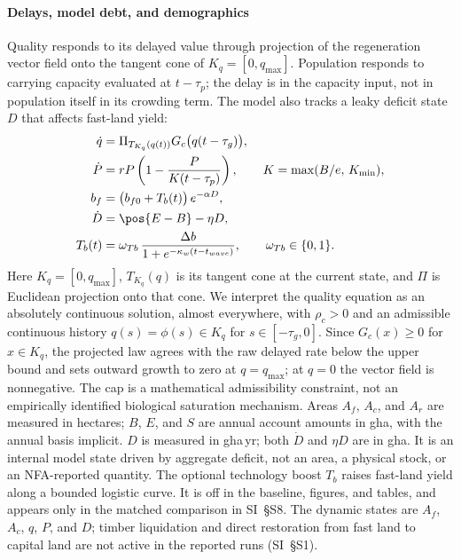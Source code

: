 \paragraph{Delays, model debt, and demographics} Quality responds to its delayed value through projection of the regeneration vector field onto the tangent cone of $K_q=[0,q_{\max}]$. Population responds to carrying capacity evaluated at $t-\tau_p$; the delay is in the capacity input, not in population itself in its crowding term. The model also tracks a leaky deficit state $D$ that affects fast-land yield:
\begin{align}
\dot q&=\Pi_{T_{K_q}(q(t))}G_c\big(q(t-\tau_g)\big),\label{eq:q}\\
\dot P&=rP\left(1-\frac{P}{K(t-\tau_p)}\right),\qquad K=\max(B/e,\,K_{\min}),\label{eq:P}\\
b_f&=\big(b_{f0}+T_b(t)\big)\,e^{-\alpha D},\label{eq:bf}\\
\dot D&=\pos{E-B}-\eta D,\label{eq:D}\\
T_b(t)&=\omega_{Tb}\,\frac{\Delta b}{1+e^{-\kappa_w(t-t_{wave})}},\qquad \omega_{Tb}\in\{0,1\}.\label{eq:Tb}
\end{align}
Here $K_q=[0,q_{\max}]$, $T_{K_q}(q)$ is its tangent cone at the current state, and $\Pi$ is Euclidean projection onto that cone. We interpret the quality equation as an absolutely continuous solution, almost everywhere, with $\rho_c>0$ and an admissible continuous history $q(s)=\phi(s)\in K_q$ for $s\in[-\tau_g,0]$. Since $G_c(x)\ge0$ for $x\in K_q$, the projected law agrees with the raw delayed rate below the upper bound and sets outward growth to zero at $q=q_{\max}$; at $q=0$ the vector field is nonnegative. The cap is a mathematical admissibility constraint, not an empirically identified biological saturation mechanism.
Areas $A_f$, $A_c$, and $A_r$ are measured in hectares; $B$, $E$, and $S$ are annual account amounts in gha, with the annual basis implicit. $D$ is measured in gha\,yr; both $\dot D$ and $\eta D$ are in gha. It is an internal model state driven by aggregate deficit, not an area, a physical stock, or an NFA-reported quantity. The optional technology boost $T_b$ raises fast-land yield along a bounded logistic curve. It is off in the baseline, figures, and tables, and appears only in the matched comparison in SI~\S S8. The dynamic states are $A_f$, $A_c$, $q$, $P$, and $D$; timber liquidation and direct restoration from fast land to capital land are not active in the reported runs (SI~\S S1).

